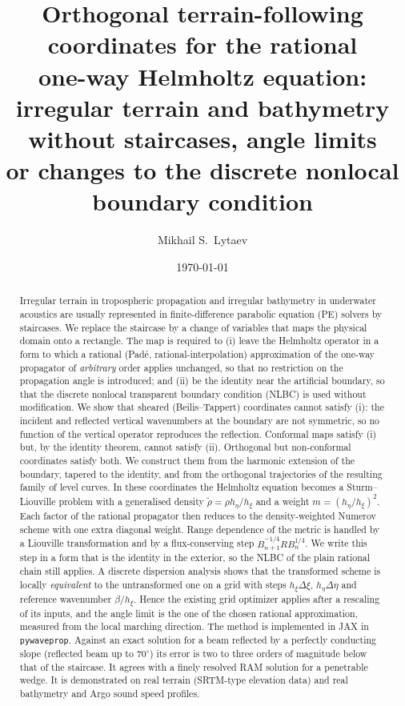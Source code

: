 \documentclass[11pt,a4paper]{article}
\title{Orthogonal terrain-following coordinates for the rational\\
one-way Helmholtz equation:\\
irregular terrain and bathymetry without staircases, angle limits\\
or changes to the discrete nonlocal boundary condition}
\author{Mikhail S.\ Lytaev}
\date{\today}
\theoremstyle{remark}
\newcommand{\rt}{\tilde\rho}
\begin{document}
\maketitle

\begin{abstract}
Irregular terrain in tropospheric propagation and irregular bathymetry in
underwater acoustics are usually represented in finite-difference parabolic
equation (PE) solvers by staircases. We replace the staircase by a change of
variables that maps the physical domain onto a rectangle. The map is required
to (i) leave the Helmholtz operator in a form to which a rational
(Pad\'e, rational-interpolation) approximation of the one-way propagator of
\emph{arbitrary} order applies unchanged, so that no restriction on the
propagation angle is introduced; and (ii) be the identity near the artificial
boundary, so that the discrete nonlocal transparent boundary condition (NLBC)
is used without modification. We show that sheared (Beilis--Tappert) coordinates
cannot satisfy (i): the incident and reflected vertical wavenumbers at the
boundary are not symmetric, so no function of the vertical operator reproduces
the reflection. Conformal maps satisfy (i) but, by the identity theorem, cannot
satisfy (ii). Orthogonal but non-conformal coordinates satisfy both. We
construct them from the harmonic extension of the boundary, tapered to the
identity, and from the orthogonal trajectories of the resulting family of level
curves. In these coordinates the Helmholtz equation becomes a Sturm--Liouville
problem with a generalised density $\rt=\rho h_\eta/h_\xi$ and a weight $m=(h_\eta/h_\xi)^2$.
Each factor of the rational propagator then reduces to the density-weighted
Numerov scheme with one extra diagonal weight. Range dependence of the metric
is handled by a Liouville transformation and by a flux-conserving step
$B_{n+1}^{-1/4}R B_n^{1/4}$. We write this step in a form that is the identity
in the exterior, so the NLBC of the plain rational chain still applies. A
discrete dispersion analysis shows that the transformed scheme is locally
\emph{equivalent} to the untransformed one on a grid with steps
$h_\xi\Delta\xi$, $h_\eta\Delta\eta$ and reference wavenumber $\beta/h_\xi$. Hence
the existing grid optimizer applies after a rescaling of its inputs, and the
angle limit is the one of the chosen rational approximation, measured from the
local marching direction. The method is implemented in JAX in
\texttt{pywaveprop}. Against an exact solution for a beam reflected by a
perfectly conducting slope (reflected beam up to $70^\circ$) its error is two to
three orders of magnitude below that of the staircase. It agrees with a
finely resolved RAM solution for a penetrable wedge. It is demonstrated on
real terrain (SRTM-type elevation data) and real bathymetry and Argo sound
speed profiles.
\end{abstract}
\end{document}
